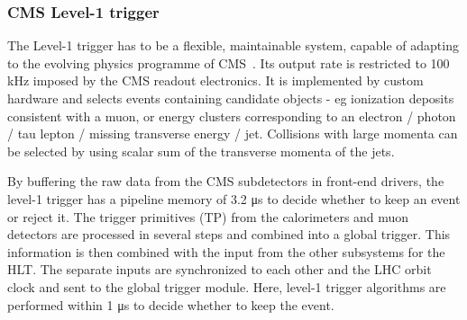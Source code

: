 \subsubsection*{CMS Level-1 trigger}
The Level-1 trigger has to be a flexible, maintainable system, capable of adapting to the evolving physics programme of CMS~\cite{Khachatryan:2016bia}. Its output rate is restricted to 100 \si{ \kilo \hertz} imposed by the CMS readout electronics. It is implemented by custom hardware and selects events containing candidate objects - eg ionization deposits consistent with a muon, or energy clusters corresponding to an electron / photon / tau lepton / missing transverse energy / jet. Collisions with large momenta can be selected by using scalar sum of the transverse momenta of the jets. 

By buffering the raw data from the CMS subdetectors in front-end drivers, the level-1 trigger has a pipeline memory of 3.2 \si{ \micro \second} to decide whether to keep an event or reject it. 
The trigger primitives (TP) from the calorimeters and muon detectors are processed in several steps and combined into a global trigger. This information is then combined with the input from the other subsystems for the HLT. The separate inputs are synchronized to each other and the LHC orbit clock and sent to the global trigger module. Here, level-1 trigger algorithms are performed within 1 \si{ \micro \second} to decide whether to  keep the event. 

